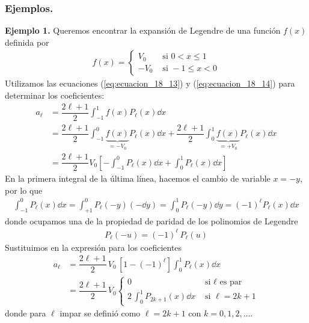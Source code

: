 \subsubsection{Ejemplos.}
\textbf{Ejemplo 1.} Queremos encontrar la expansión de Legendre de una función $f(x)$ definida por
\begin{align*}
f(x) = \begin{cases}
V_{0} & \text{ si } 0 < x \leq 1 \\
- V_{0} & \text{ si } -1 \leq x < 0
\end{cases}
\end{align*}
Utilizamos las ecuaciones (\ref{eq:ecuacion_18_13}) y (\ref{eq:ecuacion_18_14}) para determinar los coeficientes:
\begin{align*}
a_{\ell} &= \dfrac{2 \ell + 1}{2} \int_{-1}^{1} f(x) P_{\ell} (x) \dd{x} \\[1em]
&= \dfrac{2 \ell + 1}{2} \int_{-1}^{0} \underbrace{f(x)}_{=-V_0}  P_{\ell} (x) \dd{x} + \dfrac{2 \ell + 1}{2} \int_{0}^{1} \underbrace{f(x)}_{=+V_0}  P_{\ell} (x) \dd{x} \\[1em]
&= \dfrac{2 \ell + 1}{2} V_{0} \left[ - \int_{-1}^{0} P_{\ell} (x) \dd{x} + \int_{0}^{1} P_{\ell} (x) \dd{x} \right]
\end{align*}
En la primera integral de la última línea, hacemos el cambio de variable $x = -y$, por lo que
\begin{align*}
\int_{-1}^{0} P_{\ell} (x) \dd{x} = \int_{+1}^{0} P_{\ell} (-y) (-\dd{y}) = \int_{0}^{1} P_{\ell} (-y) \dd{y} = (-1)^{\ell} P_{\ell} (x) \dd{x}
\end{align*}
donde ocupamos una de la propiedad de paridad de los polinomios de Legendre
\begin{align*}
P_{\ell} (-u) = (-1)^{\ell} \, P_{\ell} (u)
\end{align*}
Sustituimos en la expresión para los coeficientes
\begin{align*}
a_{\ell} &= \dfrac{2 \ell + 1}{2} \, V_{0} \,  [1 - (-1)^{\ell} ] \int_{0}^{1} P_{\ell} (x) \dd{x} \\[1em]
&= \dfrac{2 \ell + 1}{2} \, V_{0} \begin{cases}
0 & \text{ si } \ell \text{ es par} \\
\displaystyle 2  \, \int_{0}^{1} P_{2 k + 1} (x) \dd{x} & \text{ si } \ell = 2 k + 1 
\end{cases}
\end{align*}
donde para $\ell$ impar se definió como $\ell = 2 k + 1$ con $k = 0, 1, 2, \ldots$.
\par
